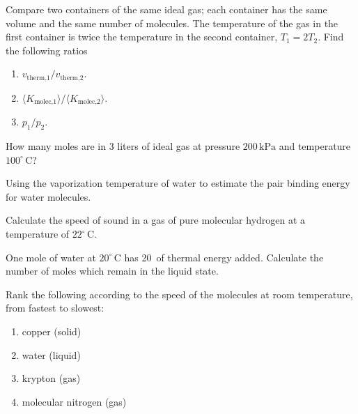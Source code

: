\begin{exercise}
Compare two containers of the same ideal gas; each container has 
the same volume and the same number of molecules.  The temperature 
of the gas in the first container is twice the temperature in the 
second container,
$T_1=2T_2$.  Find the following ratios
\begin{enumerate}
\item $v_\text{therm,1}/v_\text{therm,2}$.
\item $\langle K_\text{molec,1}\rangle/\langle K_\text{molec,2}\rangle$.
\item $p_1/p_2$.
\end{enumerate}
\label{problem:ideal_gas_ratios}
\end{exercise}

\begin{exercise}
How many moles are in 3 liters of ideal gas at pressure $200\,\text{kPa}$
and temperature $100^\circ\,\text{C}$?
\label{problem:ideal_gas_moles}
\end{exercise}

\begin{exercise} 
  Using the vaporization temperature of water to estimate the pair
  binding energy for water molecules.
\label{problem:heat_of_vaporization}
\end{exercise}


\begin{exercise}
Calculate the speed of sound in a gas of pure molecular hydrogen at a
temperature of $22^\circ\,\text{C}$.
\label{problem:speed_of_sound}
\end{exercise}





\begin{exercise}
One mole of water at $20^\circ\,\text{C}$ has 20\, of thermal
energy added.  Calculate the number of moles which remain in the liquid
state.
\end{exercise}


\begin{exercise}
Rank the following according to the speed of the molecules at room
temperature, from fastest to slowest:
\begin{enumerate}
\item copper (solid)
\item water (liquid)
\item krypton (gas)
\item molecular nitrogen (gas)
\end{enumerate}
\end{exercise}


